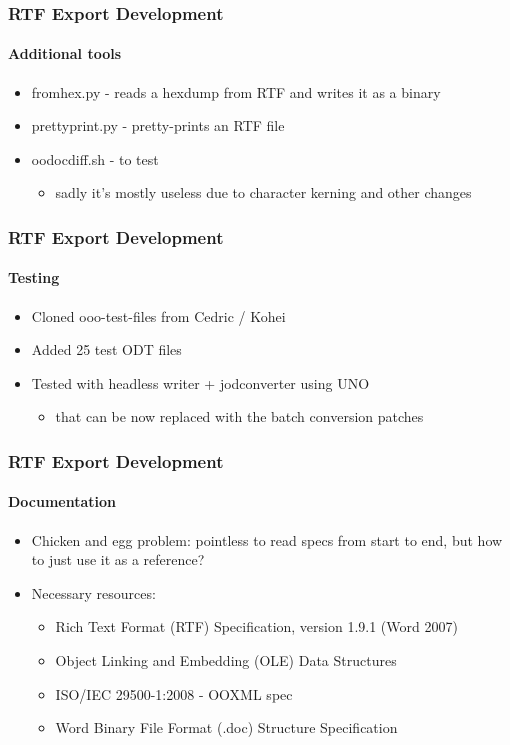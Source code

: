 \documentclass[hyperref={pdfpagelabels=false}]{beamer}
\begin{document}
\begin{frame}
\frametitle{RTF Export Development}
\framesubtitle{Additional tools}
\begin{itemize}
\item fromhex.py - reads a hexdump from RTF and writes it as a binary
\item prettyprint.py - pretty-prints an RTF file
\item oodocdiff.sh - to test
\begin{itemize}
\item sadly it's mostly useless due to character kerning and other changes
\end{itemize}
\end{itemize}
\end{frame}

\begin{frame}
\frametitle{RTF Export Development}
\framesubtitle{Testing}
\begin{itemize}
\item Cloned ooo-test-files from Cedric / Kohei
\item Added 25 test ODT files
\item Tested with headless writer + jodconverter using UNO
\begin{itemize}
\item that can be now replaced with the batch conversion patches
\end{itemize}
\end{itemize}
\end{frame}

\begin{frame}
\frametitle{RTF Export Development}
\framesubtitle{Documentation}
\begin{itemize}
\item Chicken and egg problem: pointless to read specs from start to end, but
how to just use it as a reference?
\item Necessary resources:
\begin{itemize}
\item Rich Text Format (RTF) Specification, version 1.9.1 (Word 2007)
\item Object Linking and Embedding (OLE) Data Structures
\item ISO/IEC 29500-1:2008 - OOXML spec
\item Word Binary File Format (.doc) Structure Specification
\end{itemize}
\end{itemize}
\end{frame}
\end{document}
